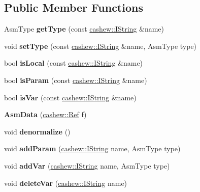 \subsection*{Public Member Functions}
\begin{DoxyCompactItemize}
\item 
\mbox{\label{struct_asm_data_a8f5ac899108e9ea73a3cc8b55d2d87c5}} 
Asm\+Type {\bfseries get\+Type} (const \mbox{\hyperlink{structcashew_1_1_i_string}{cashew\+::\+I\+String}} \&name)
\item 
\mbox{\label{struct_asm_data_a1ba2c322c57d5efbe1da80e43e741e3c}} 
void {\bfseries set\+Type} (const \mbox{\hyperlink{structcashew_1_1_i_string}{cashew\+::\+I\+String}} \&name, Asm\+Type type)
\item 
\mbox{\label{struct_asm_data_a5ad35d00d1529b927625e07e4a62bf8e}} 
bool {\bfseries is\+Local} (const \mbox{\hyperlink{structcashew_1_1_i_string}{cashew\+::\+I\+String}} \&name)
\item 
\mbox{\label{struct_asm_data_aadf289087c531ed645fd893398dbfd4c}} 
bool {\bfseries is\+Param} (const \mbox{\hyperlink{structcashew_1_1_i_string}{cashew\+::\+I\+String}} \&name)
\item 
\mbox{\label{struct_asm_data_aafdccc0a652a0fbf9c0f2325005a63b1}} 
bool {\bfseries is\+Var} (const \mbox{\hyperlink{structcashew_1_1_i_string}{cashew\+::\+I\+String}} \&name)
\item 
\mbox{\label{struct_asm_data_aff7220612c66ce94f13b6226f325bfe2}} 
{\bfseries Asm\+Data} (\mbox{\hyperlink{structcashew_1_1_ref}{cashew\+::\+Ref}} f)
\item 
\mbox{\label{struct_asm_data_a72a82911967ff5dd097399fdf2277bfa}} 
void {\bfseries denormalize} ()
\item 
\mbox{\label{struct_asm_data_a59a895b3fc1b1d2efcdddb819b84cad6}} 
void {\bfseries add\+Param} (\mbox{\hyperlink{structcashew_1_1_i_string}{cashew\+::\+I\+String}} name, Asm\+Type type)
\item 
\mbox{\label{struct_asm_data_a7a763a57c92cecaf4e7e67bb36764f96}} 
void {\bfseries add\+Var} (\mbox{\hyperlink{structcashew_1_1_i_string}{cashew\+::\+I\+String}} name, Asm\+Type type)
\item 
\mbox{\label{struct_asm_data_a1b267ffcd7714a25da42dc8057c0ead5}} 
void {\bfseries delete\+Var} (\mbox{\hyperlink{structcashew_1_1_i_string}{cashew\+::\+I\+String}} name)
\end{DoxyCompactItemize}
